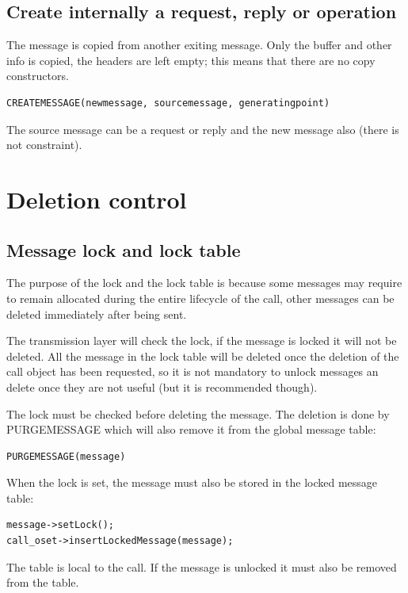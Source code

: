 \documentclass[a4paper]{report}
\begin{document}
\subsection{Create internally a request, reply or operation}
	
The message is copied from another exiting message. Only the buffer and other info is copied, the headers are left empty; this means that there are no copy constructors.	
	
\begin{verbatim}
CREATEMESSAGE(newmessage, sourcemessage, generatingpoint)
\end{verbatim}

The source message can be a request or reply and the new message also (there is not constraint).

\section{Deletion control}

\subsection{Message lock and lock table}

The purpose of the lock and the lock table is because some messages may require to remain allocated during the entire lifecycle of the call,
other messages can be deleted immediately after being sent.

The transmission layer will check the lock, if the message is locked it will not be deleted. 
All the message in the lock table will be deleted once the deletion of the call object has been requested, so it is not mandatory to unlock messages an delete once they are not useful
(but it is recommended though).

The lock must be checked before deleting the message. The deletion is done by PURGEMESSAGE which will also remove it from the global message table:
\begin{verbatim}
PURGEMESSAGE(message)
\end{verbatim}

When the lock is set, the message must also be stored in the locked message table:
\begin{verbatim}
message->setLock();
call_oset->insertLockedMessage(message);
\end{verbatim}
The table is local to the call. If the message is unlocked it must also be removed from the table.
\end{document}
